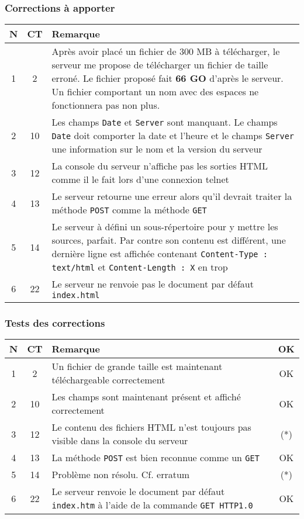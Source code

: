 \documentclass[a4paper, 11pt]{article}
\begin{document}
\subsubsection{Corrections à apporter}

\begin{longtable}{ c | c | p{15.4cm}}
N & CT & Remarque \\
\hline
\hline
1 & 2 & Après avoir placé un fichier de 300 MB à télécharger, le serveur me propose de télécharger un fichier de taille erroné. Le fichier proposé fait \textbf{66 GO} d'après le serveur. Un fichier comportant un nom avec des espaces ne fonctionnera pas non plus. \\
\hline
2 & 10 & Les champs \texttt{Date} et \texttt{Server} sont manquant. Le champs \texttt{Date} doit comporter la date et l'heure et le champs \texttt{Server} une information sur le nom et la version du serveur \\
\hline
3 & 12 & La console du serveur n'affiche pas les sorties HTML comme il le fait lors d'une connexion telnet \\
\hline
4 & 13 & Le serveur retourne une erreur alors qu'il devrait traiter la méthode \texttt{POST} comme la méthode \texttt{GET} \\
\hline
5 & 14 & Le serveur à défini un sous-répertoire pour y mettre les sources, parfait. Par contre son contenu est différent, une dernière ligne est affichée contenant \texttt{Content-Type : text/html} et \texttt{Content-Length : X} en trop \\
\hline
6 & 22 & Le serveur ne renvoie pas le document par défaut \texttt{index.html} \\
\hline %
\end{longtable}


\subsubsection{Tests des corrections}

\begin{longtable}{ c | c | p{14 cm}|c}
	N & CT & Remarque & OK\\
	\hline
	\hline
	1 & 2 & Un fichier de grande taille est maintenant téléchargeable correctement & OK \\
	\hline
	2 & 10 & Les champs sont maintenant présent et affiché correctement & OK \\
	\hline
	3 & 12 &  Le contenu des fichiers HTML n'est toujours pas visible dans la console du serveur & (*) \\
	\hline
	4 & 13 & La méthode \texttt{POST} est bien reconnue comme un \texttt{GET} & OK \\
	\hline
	5 & 14 & Problème non résolu. Cf. erratum & (*) \\
	\hline
	6 & 22 & Le serveur renvoie le document par défaut \texttt{index.htm} à l'aide de la commande \texttt{GET HTTP1.0} & OK \\
	\hline %
\end{longtable}
\end{document}

